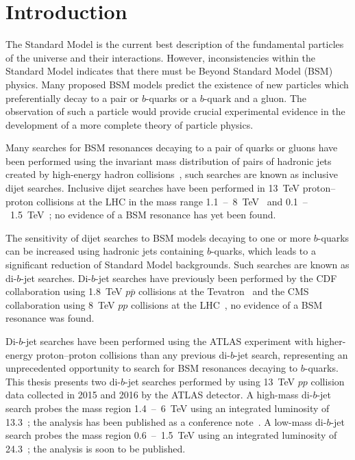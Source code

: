\chapter{Introduction}
\label{sec:int}
The Standard Model is the current best description of the fundamental particles of the universe and their interactions.
However, inconsistencies within the Standard Model indicates that
there must be Beyond Standard Model (BSM) physics.
Many proposed BSM models predict the existence of new particles
which preferentially decay to a pair or $b$-quarks or a $b$-quark and a gluon.
The observation of such a particle would provide crucial experimental
evidence in the development of a more complete theory of particle physics.


Many searches for BSM resonances decaying to a pair of quarks or gluons
have been performed using the invariant mass distribution of pairs of hadronic jets created
by high-energy hadron collisions~\cite{theo-dijet_harris}, such searches are known as inclusive dijet searches.
Inclusive dijet searches have been performed in 13~TeV proton--proton collisions at the LHC
in the mass range 1.1~--~8~TeV~\cite{dijet-mori16_paper,dijet-mori17_paper,dijet-cms}
and 0.1~--~1.5~TeV~\cite{dijet-isr,dijet-TLA,dijet-isr_cms};
no evidence of a BSM resonance has yet been found.

The sensitivity of dijet searches to BSM models decaying to one or more $b$-quarks can be increased
using hadronic jets containing $b$-quarks,
which leads to a significant reduction of Standard Model backgrounds.
Such searches are known as di-$b$-jet searches.
Di-$b$-jet searches have previously been performed by
the CDF collaboration using 1.8~TeV $p\bar{p}$ collisions at the Tevatron~\cite{dibjet-cdf}
and the CMS collaboration using 8~TeV $pp$ collisions at the LHC~\cite{dibjet-cms},
no evidence of a BSM resonance was found.

Di-$b$-jet searches have been performed using the ATLAS experiment
with higher-energy proton--proton collisions than any previous \mbox{di-$b$-jet} search,
representing an unprecedented opportunity to search for BSM resonances decaying to $b$-quarks.
This thesis presents two di-$b$-jet searches performed by using
13~TeV $pp$ collision data collected in 2015 and 2016 by the ATLAS detector.
A high-mass di-$b$-jet search probes the mass region 1.4~--~6~TeV using an integrated luminosity of 13.3~\ifb{};
the analysis has been published as a conference note~\cite{dibjet-ichep_conf}.
A low-mass di-$b$-jet search probes the mass region 0.6~--~1.5~TeV using an integrated luminosity of 24.3~\ifb{};
the analysis is soon to be published.

